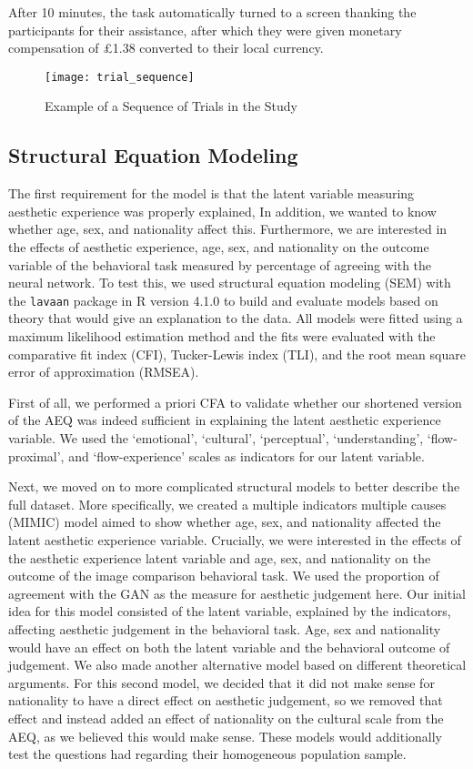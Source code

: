 \documentclass[../main.tex]{subfiles}
\begin{document}
	After 10 minutes, the task automatically turned to a screen thanking the participants for their assistance, after which they were given monetary compensation of £1.38 converted to their local currency.
	
	
	\begin{figure}
		\centering
		\caption{Example of a Sequence of Trials in the Study}
		\label{fig:trial_sequence}
		\texttt{[image: trial\_sequence]}
	\end{figure}


	\subsection{Structural Equation Modeling}
	The first requirement for the model is that the latent variable measuring aesthetic experience was properly explained, In addition, we wanted to know whether age, sex, and nationality affect this. Furthermore, we are interested in the effects of aesthetic experience, age, sex, and nationality on the outcome variable of the behavioral task measured by percentage of agreeing with the neural network. To test this, we used structural equation modeling (SEM) with the \texttt{lavaan} package \parencite{rosseel2012lavaan} in R version 4.1.0 \parencite{rcoreteamlanguage} to build and evaluate models based on theory that would give an explanation to the data. All models were fitted using a maximum likelihood estimation method and the fits were evaluated with the comparative fit index (CFI), Tucker-Lewis index (TLI), and the root mean square error of approximation (RMSEA).
	
	First of all, we performed a priori CFA to validate whether our shortened version of the AEQ was indeed sufficient in explaining the latent aesthetic experience variable. We used the `emotional', `cultural', `perceptual', `understanding', `flow-proximal', and `flow-experience' scales as indicators for our latent variable. 
	
	Next, we moved on to more complicated structural models to better describe the full dataset. More specifically, we created a multiple indicators multiple causes (MIMIC) model aimed to show whether age, sex, and nationality affected the latent aesthetic experience variable. Crucially, we were interested in the effects of the aesthetic experience latent variable and age, sex, and nationality on the outcome of the image comparison behavioral task. We used the proportion of agreement with the GAN as the measure for aesthetic judgement here. Our initial idea for this model consisted of the latent variable, explained by the indicators, affecting aesthetic judgement in the behavioral task. Age, sex and nationality would have an effect on both the latent variable and the behavioral outcome of judgement. We also made another alternative model based on different theoretical arguments. For this second model, we decided that it did not make sense for nationality to have a direct effect on aesthetic judgement, so we removed that effect and instead added an effect of nationality on the cultural scale from the AEQ, as we believed this would make sense. These models would additionally test the questions \textcite{wanzerExperiencingFlowViewing2020} had regarding their homogeneous population sample. 
	
\end{document}
